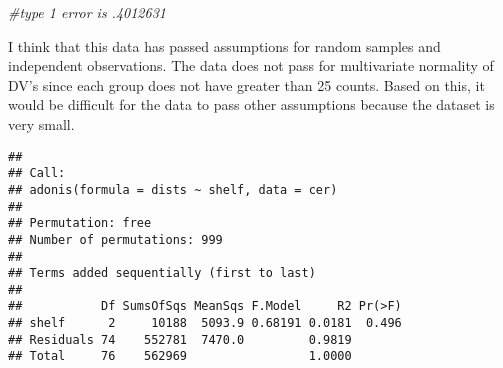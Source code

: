 \documentclass[]{article}
\newenvironment{Shaded}{\begin{snugshade}}{\end{snugshade}}
\newcommand{\CommentTok}[1]{\textcolor[rgb]{0.56,0.35,0.01}{\textit{#1}}}
\newcommand{\DataTypeTok}[1]{\textcolor[rgb]{0.13,0.29,0.53}{#1}}
\newcommand{\KeywordTok}[1]{\textcolor[rgb]{0.13,0.29,0.53}{\textbf{#1}}}
\newcommand{\NormalTok}[1]{#1}
\newcommand{\OperatorTok}[1]{\textcolor[rgb]{0.81,0.36,0.00}{\textbf{#1}}}
\begin{document}
\begin{Shaded}
\begin{Highlighting}[]
\CommentTok{#type 1 error is .4012631}
\end{Highlighting}
\end{Shaded}

I think that this data has passed assumptions for random samples and
independent observations. The data does not pass for multivariate
normality of DV's since each group does not have greater than 25 counts.
Based on this, it would be difficult for the data to pass other
assumptions because the dataset is very small.

\begin{Shaded}
\end{Shaded}

\begin{verbatim}
## 
## Call:
## adonis(formula = dists ~ shelf, data = cer) 
## 
## Permutation: free
## Number of permutations: 999
## 
## Terms added sequentially (first to last)
## 
##           Df SumsOfSqs MeanSqs F.Model     R2 Pr(>F)
## shelf      2     10188  5093.9 0.68191 0.0181  0.496
## Residuals 74    552781  7470.0         0.9819       
## Total     76    562969                 1.0000
\end{verbatim}
\end{document}
